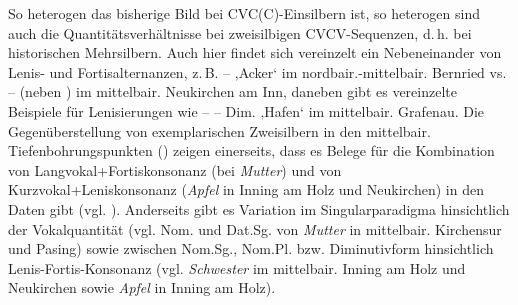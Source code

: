 So heterogen das bisherige Bild bei CVC(C)-Einsilbern ist, so heterogen sind auch die Quantitätsverhältnisse bei zweisilbigen CVCV-Sequenzen, d.\,h. bei historischen Mehrsilbern. Auch hier findet sich vereinzelt ein Nebeneinander von Lenis- und Fortisalternanzen, z.\,B.  --  ‚Acker‘ im nordbair.-mittelbair. Bernried vs.  --  (neben ) im mittelbair. Neukirchen am Inn, daneben gibt es vereinzelte Beispiele für Lenisierungen wie  --  -- Dim.  ‚Hafen‘ im mittelbair. Grafenau. Die Gegenüberstellung von exemplarischen Zweisilbern in den mittelbair. Tiefenbohrungspunkten () zeigen einerseits, dass es Belege für die Kombination von Langvokal+Fortiskonsonanz (bei \textit{Mutter}) und von Kurz\-vo\-kal+Le\-nis\-kon\-so\-nanz (\textit{Apfel} in Inning am Holz und Neukirchen) in den Daten gibt (vgl. \citealt{MoosmüllerBrandstätter2014}). Anderseits gibt es Variation im Singularparadigma hinsichtlich der Vokalquantität (vgl. Nom. und Dat.Sg. von \textit{Mutter} in mittelbair. Kirchensur und Pasing) sowie zwischen Nom.Sg., Nom.Pl. bzw. Diminutivform hinsichtlich Lenis-Fortis-Konsonanz (vgl. \textit{Schwester} im mittelbair. Inning am Holz und Neukirchen sowie \textit{Apfel} in Inning am Holz).

